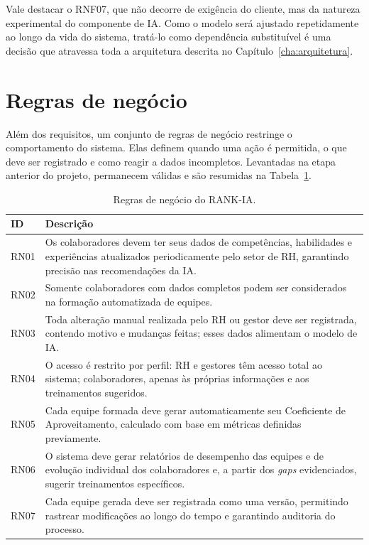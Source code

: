 \documentclass[a4paper,12pt,oneside,openany]{book}
\begin{document}
Vale destacar o RNF07, que não decorre de exigência do cliente, mas da natureza
experimental do componente de IA. Como o modelo será ajustado repetidamente ao
longo da vida do sistema, tratá-lo como dependência substituível é uma decisão
que atravessa toda a arquitetura descrita no Capítulo~\ref{cha:arquitetura}.

\section{Regras de negócio}

Além dos requisitos, um conjunto de regras de negócio restringe o
comportamento do sistema. Elas definem quando uma ação é permitida, o que deve
ser registrado e como reagir a dados incompletos. Levantadas na etapa anterior
do projeto, permanecem válidas e são resumidas na
Tabela~\ref{tab:regras-negocio}.

\begin{table}[H]
\centering
\caption{Regras de negócio do RANK-IA.}
\label{tab:regras-negocio}
\begin{tabularx}{0.95\textwidth}{p{} X}
\toprule
\textbf{ID} & \textbf{Descrição} \\
\midrule
RN01 & Os colaboradores devem ter seus dados de competências, habilidades e
experiências atualizados periodicamente pelo setor de RH, garantindo
precisão nas recomendações da IA. \\
RN02 & Somente colaboradores com dados completos podem ser considerados na
formação automatizada de equipes. \\
RN03 & Toda alteração manual realizada pelo RH ou gestor deve ser
registrada, contendo motivo e mudanças feitas; esses dados alimentam o
modelo de IA. \\
RN04 & O acesso é restrito por perfil: RH e gestores têm acesso total ao
sistema; colaboradores, apenas às próprias informações e aos treinamentos
sugeridos. \\
RN05 & Cada equipe formada deve gerar automaticamente seu Coeficiente de
Aproveitamento, calculado com base em métricas definidas previamente. \\
RN06 & O sistema deve gerar relatórios de desempenho das equipes e de
evolução individual dos colaboradores e, a partir dos \textit{gaps}
evidenciados, sugerir treinamentos específicos. \\
RN07 & Cada equipe gerada deve ser registrada como uma versão, permitindo
rastrear modificações ao longo do tempo e garantindo auditoria do
processo. \\
\bottomrule
\end{tabularx}
\end{table}
\end{document}

